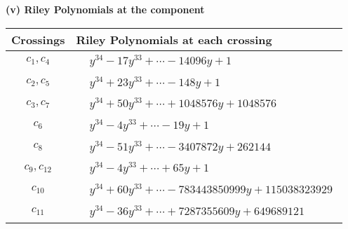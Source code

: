 \documentclass[1p]{elsarticle_modified}
\theoremstyle{definition}
\begin{document}
\newpage\renewcommand{\arraystretch}{1}
\flushleft \textbf{(v) Riley Polynomials at the component}\newline \\
\begin{tabular}{m{50pt}|m{274pt}}
Crossings & \hspace{64pt}Riley Polynomials at each crossing \\
\hline $$\begin{aligned}c_{1},c_{4}\end{aligned}$$&$\begin{aligned}
&y^{34}-17 y^{33}+\cdots-14096 y+1
\end{aligned}$\\
\hline $$\begin{aligned}c_{2},c_{5}\end{aligned}$$&$\begin{aligned}
&y^{34}+23 y^{33}+\cdots-148 y+1
\end{aligned}$\\
\hline $$\begin{aligned}c_{3},c_{7}\end{aligned}$$&$\begin{aligned}
&y^{34}+50 y^{33}+\cdots+1048576 y+1048576
\end{aligned}$\\
\hline $$\begin{aligned}c_{6}\end{aligned}$$&$\begin{aligned}
&y^{34}-4 y^{33}+\cdots-19 y+1
\end{aligned}$\\
\hline $$\begin{aligned}c_{8}\end{aligned}$$&$\begin{aligned}
&y^{34}-51 y^{33}+\cdots-3407872 y+262144
\end{aligned}$\\
\hline $$\begin{aligned}c_{9},c_{12}\end{aligned}$$&$\begin{aligned}
&y^{34}-4 y^{33}+\cdots+65 y+1
\end{aligned}$\\
\hline $$\begin{aligned}c_{10}\end{aligned}$$&$\begin{aligned}
&y^{34}+60 y^{33}+\cdots-783443850999 y+115038323929
\end{aligned}$\\
\hline $$\begin{aligned}c_{11}\end{aligned}$$&$\begin{aligned}
&y^{34}-36 y^{33}+\cdots+7287355609 y+649689121
\end{aligned}$\\
\hline
\end{tabular}\\~\\
\end{document}
